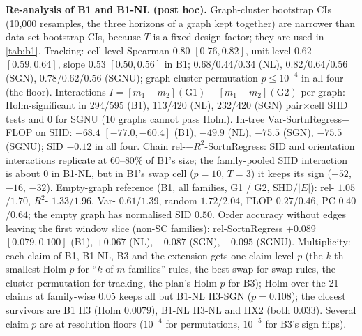 \textbf{Re-analysis of B1 and B1-NL (post hoc).} Graph-cluster bootstrap CIs
(10{,}000 resamples, the three horizons of a graph kept together) are narrower
than data-set bootstrap CIs, because $T$ is a fixed design
factor; they are used in \cref{tab:b1}. Tracking: cell-level Spearman $0.80$
$[0.76,0.82]$, unit-level $0.62$ $[0.59,0.64]$, slope $0.53$ $[0.50,0.56]$ in B1;
$0.68$/$0.44$/$0.34$ (NL), $0.82$/$0.64$/$0.56$ (SGN), $0.78$/$0.62$/$0.56$ (SGNU);
graph-cluster permutation $p\le10^{-4}$ in all four (the floor). Interactions
$I=[m_1-m_2](\mathrm{G1})-[m_1-m_2](\mathrm{G2})$ per graph: Holm-significant in
294/595 (B1), 113/420 (NL), 232/420 (SGN) pair$\times$cell SHD tests and 0 for
SGNU (10 graphs cannot pass Holm). In-tree Var-SortnRegress$-$FLOP on SHD:
$-68.4$ $[-77.0,-60.4]$ (B1), $-49.9$ (NL), $-75.5$ (SGN), $-75.5$ (SGNU); SID
$-0.12$ in all four. Chain rel-$-R^2$-SortnRegress: SID and orientation
interactions replicate at $60$--$80\%$ of B1's size; the family-pooled SHD
interaction is about $0$ in B1-NL, but in B1's swap cell ($p=10$, $T=3$) it keeps
its sign ($-52$, $-16$, $-32$). Empty-graph reference (B1, all families, G1 / G2,
SHD$/|E|$): rel- $1.05$/$1.70$, $R^2$- $1.33$/$1.96$, Var- $0.61$/$1.39$,
random $1.72$/$2.04$, FLOP $0.27$/$0.46$, PC $0.40$/$0.64$; the empty graph has
normalised SID $0.50$. Order accuracy without edges leaving the first window
slice (non-SC families): rel-SortnRegress $+0.089$ $[0.079,0.100]$ (B1), $+0.067$
(NL), $+0.087$ (SGN), $+0.095$ (SGNU). Multiplicity: each claim of
B1, B1-NL, B3 and the extension gets one claim-level $p$ (the $k$-th smallest
Holm $p$ for ``$k$ of $m$ families'' rules, the best swap for swap rules, the
cluster permutation for tracking, the plan's Holm $p$ for B3); Holm over the 21
claims at family-wise $0.05$ keeps all but B1-NL H3-SGN ($p=0.108$); the closest
survivors are B1 H3 (Holm $0.0079$), B1-NL H3-NL and HX2 (both $0.033$). Several
claim $p$ are at resolution floors ($10^{-4}$ for permutations, $10^{-5}$ for
B3's sign flips).

